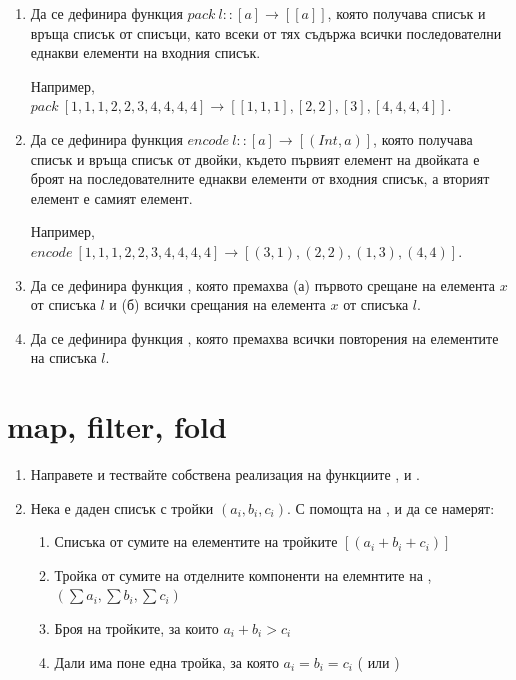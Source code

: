\begin{enumerate}[resume]
	\item Да се дефинира функция $pack \: l :: [a] \rightarrow [[a]]$, която получава списък и връща списък от списъци, като всеки от тях съдържа всички последователни еднакви елементи на входния списък.
	
	Например, $pack \: [1,1,1,2,2,3,4,4,4,4] \rightarrow [[1,1,1],[2,2],[3],[4,4,4,4]]$.

	\item Да се дефинира функция $encode \: l :: [a] \rightarrow [(Int,a)]$, която получава списък и връща списък от двойки, където първият елемент на двойката е броят на последователните еднакви елементи от входния списък, а вторият елемент е самият елемент.
	
	Например, $encode \: [1,1,1,2,2,3,4,4,4,4] \rightarrow [(3,1),(2,2),(1,3),(4,4)]$.

	\item Да се дефинира функция , която премахва (а) първото срещане на елемента $x$ от списъка $l$ и (б) всички срещания на елемента $x$ от списъка $l$.
		
	\item Да се дефинира функция , която премахва всички повторения на елементите на списъка $l$.
	
		

\end{enumerate}



\section {map, filter, fold}

\begin{enumerate}[resume]
	\item Направете и тествайте собствена реализация на функциите ,  и .
	\item Нека е даден списък  с тройки $(a_i,b_i,c_i)$. С помощта на ,  и  да се намерят:
	
	\begin{enumerate}[label=\alph*)]
		\item Списъка от сумите на елементите на тройките $[(a_i+b_i+c_i)]$
		\item Тройка от сумите на отделните компоненти на елемнтите на , $(\sum a_i,\sum b_i, \sum c_i)$
		\item Броя на тройките, за които $a_i+b_i>c_i$
		\item Дали има поне една тройка, за която $a_i=b_i=c_i$ ( или )
	\end{enumerate}
\end{enumerate}


